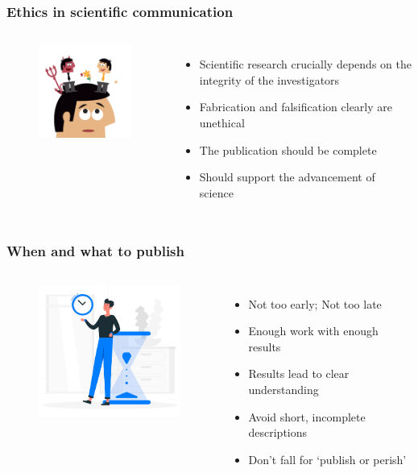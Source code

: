 \documentclass[newPxFont,sthlmFooter]{beamer}
\newcommand{\fs}{\footnotesize}
\begin{document}
\begin{frame}\frametitle{Ethics in scientific communication}
  \begin{columns}[T,onlytextwidth]
  \begin{figure}
    \centering
    \includegraphics[width=2in]{figs/eth} 
  \end{figure}
      \vspace{1cm}
  \begin{itemize}
  \fs
    \item Scientific research crucially depends on the integrity of the investigators
    \item Fabrication and falsification clearly are unethical
    \item The publication should be complete
    \item Should support the advancement of science
  \end{itemize}
  \vspace{-2cm}
  \end{columns}
\end{frame}

\begin{frame}\frametitle{When and what to publish}
  \begin{columns}[T,onlytextwidth]
  \begin{figure}
    \centering
    \includegraphics[width=2in]{figs/time} 
  \end{figure}
      \vspace{1cm}
  \begin{itemize}
  \fs
    \item Not too early; Not too late
    \item Enough work with enough results
    \item Results lead to clear understanding
    \item Avoid short, incomplete descriptions
    \item Don't fall for `publish or perish'
  \end{itemize}
  \vspace{-2cm}
  \end{columns}
\end{frame}
\end{document}
